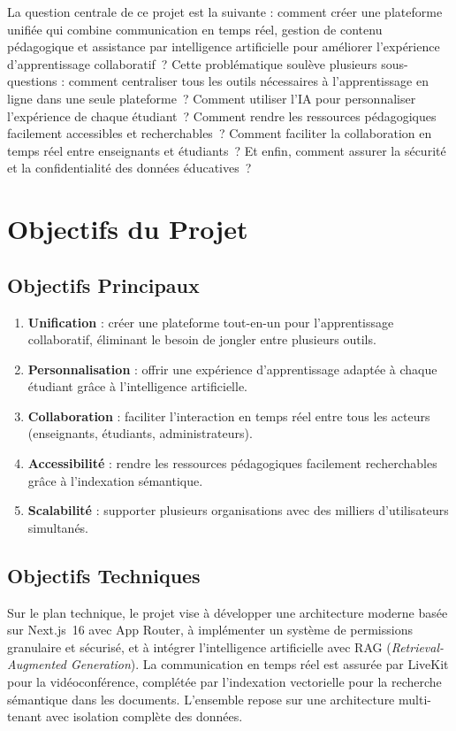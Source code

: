 \documentclass[12pt, a4paper, twoside]{report}
\begin{document}
La question centrale de ce projet est la suivante : comment créer une plateforme
unifiée qui combine communication en temps réel, gestion de contenu pédagogique et
assistance par intelligence artificielle pour améliorer l'expérience d'apprentissage
collaboratif~? Cette problématique soulève plusieurs sous-questions : comment
centraliser tous les outils nécessaires à l'apprentissage en ligne dans une seule
plateforme~? Comment utiliser l'IA pour personnaliser l'expérience de chaque
étudiant~? Comment rendre les ressources pédagogiques facilement accessibles et
recherchables~? Comment faciliter la collaboration en temps réel entre enseignants
et étudiants~? Et enfin, comment assurer la sécurité et la confidentialité des
données éducatives~?

\section{Objectifs du Projet}

\subsection{Objectifs Principaux}

\begin{enumerate}
  \item \textbf{Unification} : créer une plateforme tout-en-un pour l'apprentissage
        collaboratif, éliminant le besoin de jongler entre plusieurs outils.
  \item \textbf{Personnalisation} : offrir une expérience d'apprentissage adaptée
        à chaque étudiant grâce à l'intelligence artificielle.
  \item \textbf{Collaboration} : faciliter l'interaction en temps réel entre tous
        les acteurs (enseignants, étudiants, administrateurs).
  \item \textbf{Accessibilité} : rendre les ressources pédagogiques facilement
        recherchables grâce à l'indexation sémantique.
  \item \textbf{Scalabilité} : supporter plusieurs organisations avec des milliers
        d'utilisateurs simultanés.
\end{enumerate}

\subsection{Objectifs Techniques}

Sur le plan technique, le projet vise à développer une architecture moderne basée
sur Next.js~16 avec App Router, à implémenter un système de permissions granulaire
et sécurisé, et à intégrer l'intelligence artificielle avec RAG
(\textit{Retrieval-Augmented Generation}). La communication en temps réel est
assurée par LiveKit pour la vidéoconférence, complétée par l'indexation vectorielle
pour la recherche sémantique dans les documents. L'ensemble repose sur une
architecture multi-tenant avec isolation complète des données.
\end{document}
